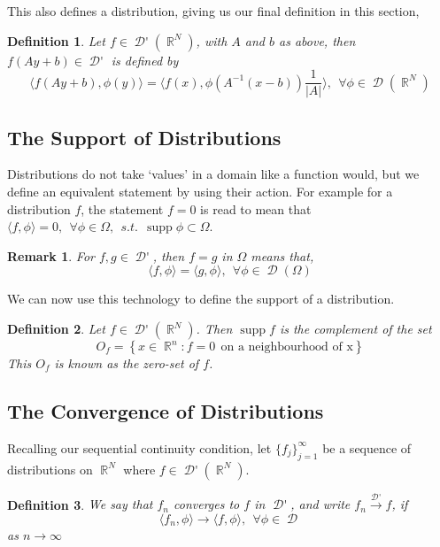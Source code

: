 \documentclass[12pt, a4]{article}
\newtheorem{definition}{Definition}[section]
\newtheorem{remark}{Remark}[section]
\DeclareMathOperator\supp{supp}
\DeclareMathOperator\reals{\mathbb{R}}
\DeclareMathOperator\tfspaceD{\mathcal{D}}
\DeclareMathOperator\dist{\mathcal{D'}}
\begin{document}
This also defines a distribution, giving us our final definition in this section,

\begin{definition}
    Let $f \in \dist(\reals^N)$, with $A$ and $b$ as above, then $f(Ay+b) \in \dist$ is defined by \[\langle f(Ay+b), \phi(y)\rangle = \langle f(x), \phi(A^{-1}(x-b))\frac{1}{|A|}\rangle, \> \> \forall \phi \in \tfspaceD(\reals^N)\]
\end{definition}

\subsection{The Support of Distributions}

Distributions do not take `values' in a domain like a function would, but we define an equivalent statement by using their action. For example for a distribution $f$, the statement $f=0$ is read to mean that $\langle f, \phi \rangle = 0, \> \> \forall \phi \in \Omega, \> \> s.t. \> \> \supp \phi \subset \Omega$.

\begin{remark}
    For $f, g \in \dist$, then $f=g$ in $\Omega$ means that, \[ \langle f, \phi \rangle = \langle g, \phi \rangle, \> \> \forall \phi \in \tfspaceD(\Omega)\]
\end{remark}

We can now use this technology to define the support of a distribution.

\begin{definition}
    Let $f \in \dist(\reals^N)$. Then $\supp f$ is the complement of the set \[ O_f = \left \{ x \in \reals^n : f = 0 \> \> \text{on a neighbourhood of x}  \right \} \] This $O_f$ is known as the zero-set of $f$.
\end{definition}

\subsection{The Convergence of Distributions}

Recalling our sequential continuity condition, let $\{f_j\}_{j=1}^\infty$ be a sequence of distributions on $\reals^N$ where $f \in \dist(\reals^N)$.

\begin{definition}
    We say that $f_n$ converges to $f$ in $\dist$, and write $f_n \overset{\dist}{\rightarrow} f$, if \[ \langle f_n, \phi \rangle \rightarrow \langle f, \phi \rangle, \> \> \forall \phi \in \tfspaceD \] as $n \rightarrow \infty$
\end{definition}
\end{document}
